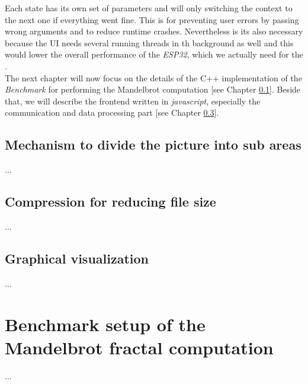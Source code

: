 Each state has its own set of parameters and will only switching the context to the next one if everything went fine. This is for preventing user errors by passing wrong arguments and to reduce runtime crashes. Nevertheless is its also necessary because the UI needs several running threads in th background as well and this would lower the overall performance of the \textit{ESP32}, which we actually need for the .\\   

\noindent The next chapter will now focus on the details of the C++ implementation of the \textit{Benchmark} for performing the Mandelbrot computation [see Chapter \ref{subsection:backend}]. Beside that, we will describe the frontend written in \textit{javascript}, especially the communication and data processing part [see Chapter \ref{subsection:frontend}]. 

\newpage

\subsection{Mechanism to divide the picture into sub areas} \label{subsection:backend}

...

\subsection{Compression for reducing file size}

...

\subsection{Graphical visualization} \label{subsection:frontend}

...\newpage

\section{Benchmark setup of the Mandelbrot fractal computation}

...
